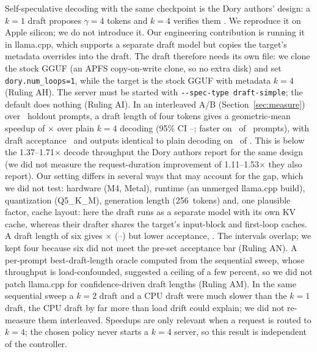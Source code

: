 \documentclass[11pt]{article}
\newcommand{\DorySpecLo}{1.37}%
\newcommand{\DorySpecHi}{1.71}%
\newcommand{\DoryReqLo}{1.11}%
\newcommand{\DoryReqHi}{1.53}%
\newcommand{\SpecTokens}{256}
\begin{document}
Self-speculative decoding with the same checkpoint is the Dory authors' design: a $k{=}1$ draft proposes $\gamma{=}4$ tokens and $k{=}4$ verifies them \citep[Sec.~6.2]{dory2026}. We reproduce it on Apple silicon; we do not introduce it. Our engineering contribution is running it in llama.cpp, which supports a separate draft model but copies the target's metadata overrides into the draft. The draft therefore needs its own file: we clone the stock GGUF (an APFS copy-on-write clone, so no extra disk) and set \texttt{dory.num\_loops=1}, while the target is the stock GGUF with metadata $k{=}4$ (Ruling AH). The server must be started with \texttt{-{}-spec-type draft-simple}; the default does nothing (Ruling AI). In an interleaved A/B (Section~\ref{sec:measure}) over \SpecPrompts\ holdout prompts, a draft length of four tokens gives a geometric-mean speedup of \SpecNFourSpeedup$\times$ over plain $k{=}4$ decoding (95\% CI \SpecNFourLo--\SpecNFourHi; faster on \SpecNFourFaster\ of \SpecPrompts\ prompts), with draft acceptance \SpecNFourAccept\ and outputs identical to plain decoding on \SpecNFourIdentical\ of \SpecPrompts. This is below the \DorySpecLo--\DorySpecHi$\times$ decode throughput the Dory authors report for the same design (we did not measure the request-duration improvement of \DoryReqLo--\DoryReqHi$\times$ they also report). Our setting differs in several ways that may account for the gap, which we did not test: hardware (M4, Metal), runtime (an unmerged llama.cpp build), quantization (Q5\_K\_M), generation length (\SpecTokens\ tokens) and, one plausible factor, cache layout: here the draft runs as a separate model with its own KV cache, whereas their drafter shares the target's input-block and first-loop caches. A draft length of six gives \SpecNSixSpeedup$\times$ (\SpecNSixLo--\SpecNSixHi) but lower acceptance, \SpecNSixAccept. The intervals overlap; we kept four because six did not meet the pre-set acceptance bar (Ruling AN). A per-prompt best-draft-length oracle computed from the sequential sweep, whose throughput is load-confounded, suggested a ceiling of a few percent, so we did not patch llama.cpp for confidence-driven draft lengths (Ruling AM). In the same sequential sweep a $k{=}2$ draft and a CPU draft were much slower than the $k{=}1$ draft, the CPU draft by far more than load drift could explain; we did not re-measure them interleaved. Speedups are only relevant when a request is routed to $k{=}4$; the chosen policy never starts a $k{=}4$ server, so this result is independent of the controller.
\end{document}
